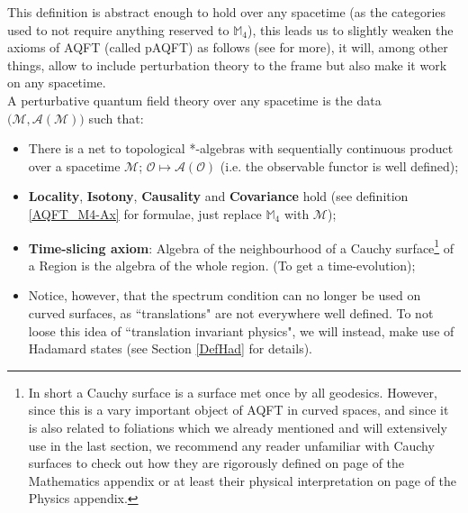 \documentclass[a4paper,11pt]{article}
\numberwithin{equation}{section}
\theoremstyle{definition}
\begin{document}
This definition is abstract enough to hold over any spacetime (as the categories used to not require anything reserved to $\mathbb{M}_4$), this leads us to slightly weaken the axioms of AQFT (called pAQFT) as follows (see \cite{pAQFT} for more), it will, among other things, allow to include perturbation theory to the frame but also make it work on any spacetime.\\
A perturbative quantum field theory over any spacetime is the data $\big(\mathcal{M},\mathcal{A}(\mathcal{M})\big)$ such that:
\begin{itemize}
    \item There is a net to topological *-algebras with sequentially continuous product over a spacetime $\mathcal{M}$; $\mathcal{O}\mapsto\mathcal{A}(\mathcal{O})$ (i.e. the observable functor is well defined);
    \item \textbf{Locality}, \textbf{Isotony}, \textbf{Causality} and \textbf{Covariance} hold (see definition \ref{AQFT_M4-Ax} for formulae, just replace $\mathbb{M}_4$ with $\mathcal{M}$);
    \item \textbf{Time-slicing axiom}: Algebra of the neighbourhood of a Cauchy surface\footnote{In short a Cauchy surface is a surface met once by all geodesics. However, since this is a vary important object of AQFT in curved spaces, and since it is also related to foliations which we already mentioned and will extensively use in the last section, we recommend any reader unfamiliar with Cauchy surfaces to check out how they are rigorously defined on page \pageref{CauchyMat} of the Mathematics appendix or at least their physical interpretation on page \pageref{CauchyPhy} of the Physics appendix.} of a Region is the algebra of the whole region. (To get a time-evolution);
    \item Notice, however, that the spectrum condition can no longer be used on curved surfaces, as ``translations" are not everywhere well defined. To not loose this idea of ``translation invariant physics", we will instead, make use of Hadamard states \label{FirstMentionHad}(see Section \ref{DefHad} for details).
\end{itemize}
\end{document}
